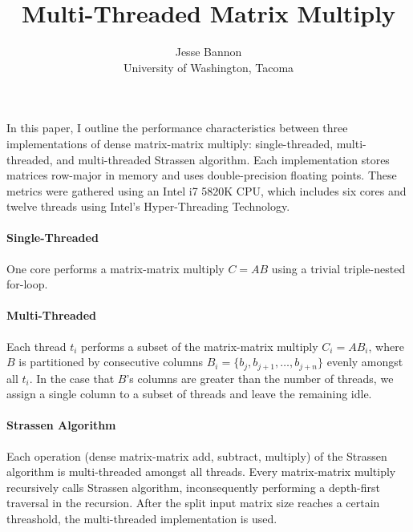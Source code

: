 \documentclass{article}
\begin{document}
\title{Multi-Threaded Matrix Multiply}
\author{Jesse Bannon\\
University of Washington, Tacoma}
\renewcommand{\today}{July 2, 2017}
\maketitle

In this paper, I outline the performance characteristics between three implementations of dense matrix-matrix multiply: single-threaded, multi-threaded, and multi-threaded Strassen algorithm. Each implementation stores matrices row-major in memory and uses double-precision floating points. These metrics were gathered using an Intel i7 5820K CPU, which includes six cores and twelve threads using Intel's Hyper-Threading Technology.

\paragraph{Single-Threaded}
One core performs a matrix-matrix multiply $C = AB$ using a trivial triple-nested for-loop.

\paragraph{Multi-Threaded}
Each thread $t_{i}$ performs a subset of the matrix-matrix multiply $C_{i} = AB_{i}$, where $B$ is partitioned by consecutive columns $B_{i} = \lbrace b_{j}, b_{j+1}, \dots, b_{j+n} \rbrace$ evenly amongst all $t_{i}$. In the case that $B$'s columns are greater than the number of threads, we assign a single column to a subset of threads and leave the remaining idle.

\paragraph{Strassen Algorithm}
Each operation (dense matrix-matrix add, subtract, multiply) of the Strassen algorithm is multi-threaded amongst all threads. Every matrix-matrix multiply recursively calls Strassen algorithm, inconsequently performing a depth-first traversal in the recursion. After the split input matrix size reaches a certain threashold, the multi-threaded implementation is used.
\end{document}
